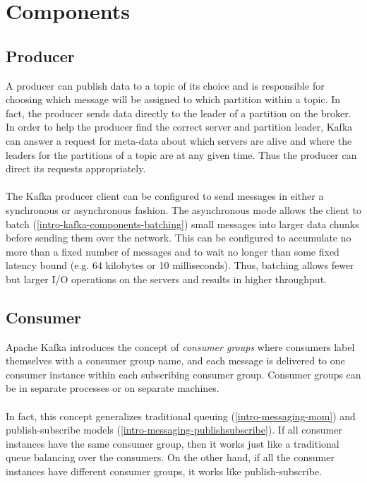 \section{Components}

\subsection{Producer}

A producer can publish data to a topic of its choice and is responsible for
choosing which message will be assigned to which partition within a topic. In
fact, the producer sends data directly to the leader of a partition on the
broker. In order to help the producer find the correct server and partition
leader, Kafka can answer a request for meta-data about which servers are alive
and where the leaders for the partitions of a topic are at any given time. Thus
the producer can direct its requests appropriately. \cite{apachekafka}
\\ \\
The Kafka producer client can be configured to send messages in either a
synchronous or asynchronous fashion. The asynchronous mode allows the client to
batch (\ref{intro-kafka-components-batching}) small messages into larger data
chunks before sending them over the network. This can be configured to accumulate
no more than a fixed number of messages and to wait no longer than some fixed
latency bound (e.g. 64 kilobytes or 10 milliseconds). Thus, batching allows
fewer but larger I/O operations on the servers and results in higher throughput.
\cite{apachekafka} \cite{goodhope2012building}

\subsection{Consumer}

Apache Kafka introduces the concept of \textit{consumer groups} where consumers
label themselves with a consumer group name, and each message is delivered to
one consumer instance within each subscribing consumer group. Consumer groups
can be in separate processes or on separate machines.
\\ \\
In fact, this concept generalizes traditional queuing (\ref{intro-messaging-mom})
and publish-subscribe models (\ref{intro-messaging-publishsubscribe}).
If all consumer instances have the same consumer
group, then it works just like a traditional queue balancing over the consumers.
On the other hand, if all the consumer instances have different consumer groups,
it works like publish-subscribe.

